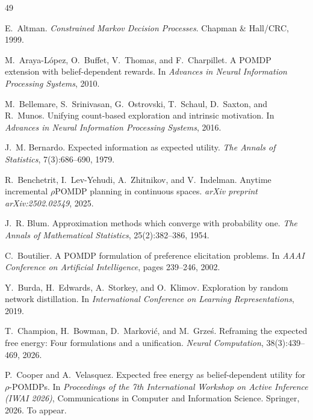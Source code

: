 \documentclass[runningheads]{llncs}
\begin{document}
\begin{thebibliography}{49}

E.~Altman.
\newblock \emph{Constrained Markov Decision Processes}.
\newblock Chapman \& Hall/CRC, 1999.

M.~Araya-L\'{o}pez, O.~Buffet, V.~Thomas, and F.~Charpillet.
\newblock A {POMDP} extension with belief-dependent rewards.
\newblock In \emph{Advances in Neural Information Processing Systems}, 2010.

M.~Bellemare, S.~Srinivasan, G.~Ostrovski, T.~Schaul, D.~Saxton, and R.~Munos.
\newblock Unifying count-based exploration and intrinsic motivation.
\newblock In \emph{Advances in Neural Information Processing Systems}, 2016.

J.~M. Bernardo.
\newblock Expected information as expected utility.
\newblock \emph{The Annals of Statistics}, 7(3):686--690, 1979.

R.~Benchetrit, I.~Lev-Yehudi, A.~Zhitnikov, and V.~Indelman.
\newblock Anytime incremental $\rho${POMDP} planning in continuous spaces.
\newblock \emph{arXiv preprint arXiv:2502.02549}, 2025.

J.~R. Blum.
\newblock Approximation methods which converge with probability one.
\newblock \emph{The Annals of Mathematical Statistics}, 25(2):382--386, 1954.

C.~Boutilier.
\newblock A {POMDP} formulation of preference elicitation problems.
\newblock In \emph{AAAI Conference on Artificial Intelligence}, pages 239--246, 2002.

Y.~Burda, H.~Edwards, A.~Storkey, and O.~Klimov.
\newblock Exploration by random network distillation.
\newblock In \emph{International Conference on Learning Representations}, 2019.

T.~Champion, H.~Bowman, D.~Markovi\'{c}, and M.~Grze\'{s}.
\newblock Reframing the expected free energy: Four formulations and a unification.
\newblock \emph{Neural Computation}, 38(3):439--469, 2026.

P.~Cooper and A.~Velasquez.
\newblock Expected free energy as belief-dependent utility for $\rho$-{POMDP}s.
\newblock In \emph{Proceedings of the 7th International Workshop on Active Inference (IWAI 2026)}, Communications in Computer and Information Science. Springer, 2026.
\newblock To appear.


\end{thebibliography}
\end{document}
